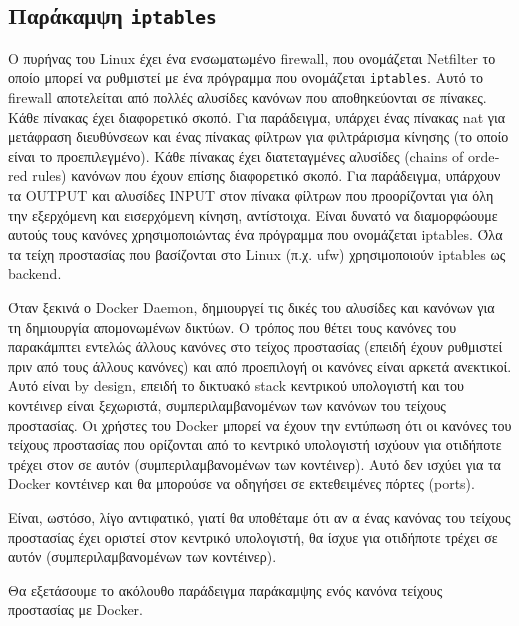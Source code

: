 \subsection{Παράκαμψη \texttt{\textlatin{iptables}}}

Ο πυρήνας του \textlatin{Linux} έχει ένα ενσωματωμένο \textlatin{firewall}, που
ονομάζεται \textlatin{Netfilter} το οποίο μπορεί να ρυθμιστεί με ένα πρόγραμμα
που ονομάζεται \texttt{\textlatin{iptables}}. Αυτό το \textlatin{firewall}
αποτελείται από πολλές αλυσίδες κανόνων που αποθηκεύονται σε πίνακες. Κάθε
πίνακας έχει διαφορετικό σκοπό.
Για παράδειγμα, υπάρχει ένας πίνακας \textlatin{nat} για μετάφραση διευθύνσεων
και ένας πίνακας φίλτρων για φιλτράρισμα κίνησης (το οποίο είναι το
προεπιλεγμένο). Κάθε πίνακας έχει διατεταγμένες αλυσίδες (\textlatin{chains of
ordered rules})
κανόνων που έχουν επίσης διαφορετικό σκοπό. Για παράδειγμα, υπάρχουν τα
\textlatin{OUTPUT} και αλυσίδες \textlatin{INPUT} στον πίνακα φίλτρων που
προορίζονται για όλη την εξερχόμενη και
εισερχόμενη κίνηση, αντίστοιχα. Είναι δυνατό να διαμορφώουμε αυτούς τους κανόνες
χρησιμοποιώντας ένα πρόγραμμα που ονομάζεται \textlatin{iptables}. Όλα τα τείχη
προστασίας που βασίζονται στο \textlatin{Linux} (π.χ. \textlatin{ufw})
χρησιμοποιούν \textlatin{iptables} ως \textlatin{backend}.

Όταν ξεκινά ο \textlatin{Docker Daemon}, δημιουργεί τις δικές του αλυσίδες και
κανόνων για τη δημιουργία απομονωμένων δικτύων. Ο τρόπος που θέτει τους κανόνες
του παρακάμπτει εντελώς άλλους κανόνες στο τείχος προστασίας (επειδή έχουν
ρυθμιστεί πριν από τους άλλους κανόνες) και από προεπιλογή οι κανόνες είναι
αρκετά ανεκτικοί. Αυτό είναι \textlatin{by design}, επειδή το δικτυακό
\textlatin{stack} κεντρικού υπολογιστή και του κοντέινερ είναι ξεχωριστά,
συμπεριλαμβανομένων των κανόνων του τείχους προστασίας. Οι χρήστες του
\textlatin{Docker} μπορεί να έχουν την εντύπωση ότι οι κανόνες του τείχους
προστασίας που ορίζονται από το κεντρικό υπολογιστή ισχύουν για οτιδήποτε τρέχει
στον σε αυτόν (συμπεριλαμβανομένων των κοντέινερ). Αυτό δεν ισχύει για τα
\textlatin{Docker} κοντέινερ και θα μπορούσε να οδηγήσει σε εκτεθειμένες πόρτες
(\textlatin{ports}).

Είναι, ωστόσο, λίγο αντιφατικό, γιατί θα υποθέταμε ότι αν α
ένας κανόνας του τείχους προστασίας έχει οριστεί στον κεντρικό υπολογιστή, θα
ίσχυε για οτιδήποτε τρέχει σε αυτόν (συμπεριλαμβανομένων των κοντέινερ).

Θα εξετάσουμε το ακόλουθο παράδειγμα παράκαμψης ενός κανόνα τείχους προστασίας
με \textlatin{Docker}. \\


